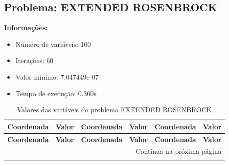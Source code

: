 \documentclass[12pt]{article}
\begin{document}
\newpage            
\subsection{Problema: EXTENDED ROSENBROCK}

\textbf{Informações:}
\begin{itemize}
\item Número de variáveis: 100
\item Iterações: 60
\item Valor mínimo: 7.047449e-07
\item Tempo de execução: 0.300s
\end{itemize}

\small
\begin{longtable}{@{}cc|cc|cc@{}}
\caption{Valores das variáveis do problema EXTENDED ROSENBROCK} \\
\toprule
\textbf{Coordenada} & \textbf{Valor} & \textbf{Coordenada} & \textbf{Valor} & \textbf{Coordenada} & \textbf{Valor} \\
\midrule
\endfirsthead

\toprule
\textbf{Coordenada} & \textbf{Valor} & \textbf{Coordenada} & \textbf{Valor} & \textbf{Coordenada} & \textbf{Valor} \\
\midrule
\endhead

\midrule \multicolumn{6}{r}{{Continua na próxima página}} \\ \midrule
\endfoot


\end{longtable}
\end{document}
